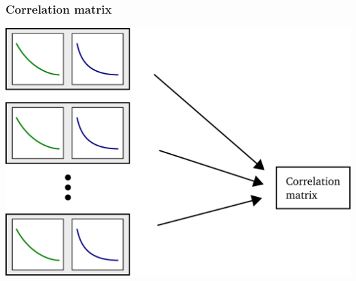 \documentclass[english, fleqn]{beamer}
\begin{document}
%

\begin{frame}
    \frametitle{Correlation matrix}
    \begin{center}
        \includegraphics[scale=\scale]{sketches/05-matrix.pdf}
    \end{center}
\end{frame}

%
%
\end{document}
